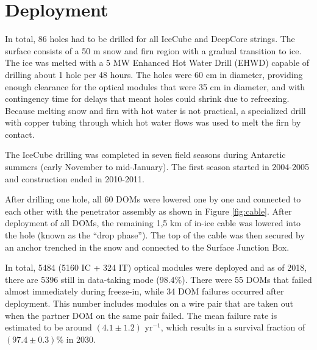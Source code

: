 \section{Deployment}
\label{sec:deployment}
In total, 86 holes had to be drilled for all IceCube and DeepCore strings. The surface consists of a 50 m snow and firn region with a gradual transition to ice. The ice was melted with a 5 MW Enhanced Hot Water Drill (EHWD) capable of drilling about 1 hole per 48 hours. The holes were 60 cm in diameter, providing enough clearance for the optical modules that were 35 cm in diameter, and with contingency time for delays that meant holes could shrink due to refreezing. Because melting snow and firn with hot water is not practical, a specialized drill with copper tubing through which hot water flows was used to melt the firn by contact.

The IceCube drilling was completed in seven field seasons during Antarctic summers (early November to mid-January). The first season started in 2004-2005 and construction ended in 2010-2011. 

After drilling one hole, all 60 DOMs were lowered one by one and connected to each other with the penetrator assembly as shown in Figure \ref{fig:cable}. After deployment of all DOMs, the remaining 1,\.5 km of in-ice cable was lowered into the hole (known as the ``drop phase''). The top of the cable was then secured by an anchor trenched in the snow and connected to the Surface Junction Box. 

In total, 5484 (5160 IC + 324 IT) optical modules were deployed and as of 2018, there are 5396 still in data-taking mode (98.4\%). There were 55 DOMs that failed almost immediately during freeze-in, while 34 DOM failures occurred after deployment. This number includes modules on a wire pair that are taken out when the partner DOM on the same pair failed. The mean failure rate is estimated to be around $(4.1 \pm 1.2)$ yr$^{-1}$, which results in a survival fraction of $(97.4 \pm 0.3)\%$ in 2030.

